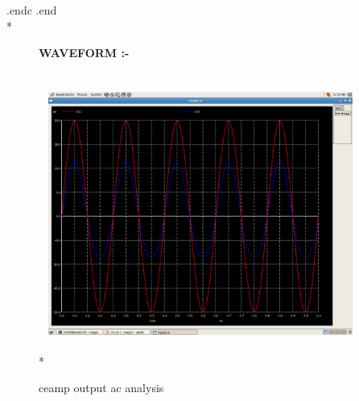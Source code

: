 \documentclass{article}
\begin{document}
\begin{flushleft}
{{.endc \newline
.end \newline
}}\\*
\begin{figure}[ht] 
\large{{\bf\textcolor{rosewood}{ WAVEFORM} :-}}\vspace{5mm} \\*
\includegraphics[width=10cm, height=10cm]{ce.png}
\caption{ceamp output ac analysis} 
\label{fig:circuit4} 
\end{figure}

\end{flushleft}
\end{document}
